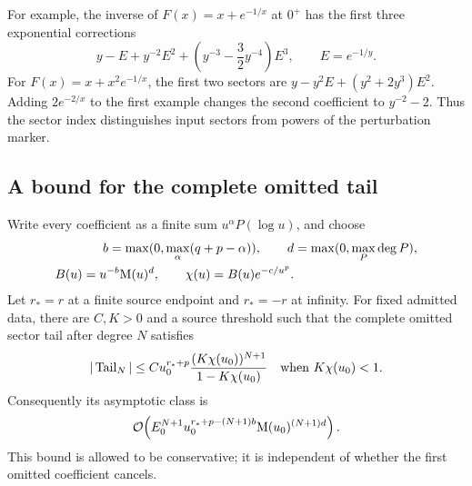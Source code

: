 For example, the inverse of $F(x)=x+e^{-1/x}$ at $0^+$ has the
first three exponential corrections
\begin{equation}
 y-E+y^{-2}E^2+
 \left(y^{-3}-\frac32 y^{-4}\right)E^3,
 \qquad E=e^{-1/y}.
 \label{eq:flat-primary-inverse}
\end{equation}
For $F(x)=x+x^2e^{-1/x}$, the first two sectors are
$y-y^2E+(y^2+2y^3)E^2$. Adding $2e^{-2/x}$ to the first example changes
the second coefficient to $y^{-2}-2$. Thus the sector index distinguishes
input sectors from powers of the perturbation marker.

\subsection{A bound for the complete omitted tail}

Write every coefficient as a finite sum $u^\alpha P(\log u)$, and choose
\[
\begin{aligned}
 b=\max(0,\max_{\alpha}(q+p-\alpha)),\qquad
 d&=\max(0,\max_P\deg P),\\
 B(u)=u^{-b}\mathrm M(u)^d,\qquad \chi(u)=B(u)e^{-c/u^p}.
\end{aligned}
\]
Let $r_*=r$ at a finite source endpoint and $r_*=-r$ at infinity.
For fixed admitted data, there are $C,K>0$ and a source threshold such that
the complete omitted sector tail after degree $N$ satisfies
\begin{equation}
 |\operatorname{Tail}_N|
 \le C u_0^{r_*+p}
 \frac{(K\chi(u_0))^{N+1}}{1-K\chi(u_0)}
 \quad\hbox{when }K\chi(u_0)<1.
 \label{eq:flat-complete-tail}
\end{equation}
Consequently its asymptotic class is
\[
 \mathcal O\!\left(E_0^{N+1}
 u_0^{r_*+p-(N+1)b}\mathrm M(u_0)^{(N+1)d}\right).
\]
This bound is allowed to be conservative; it is independent of whether the
first omitted coefficient cancels.

